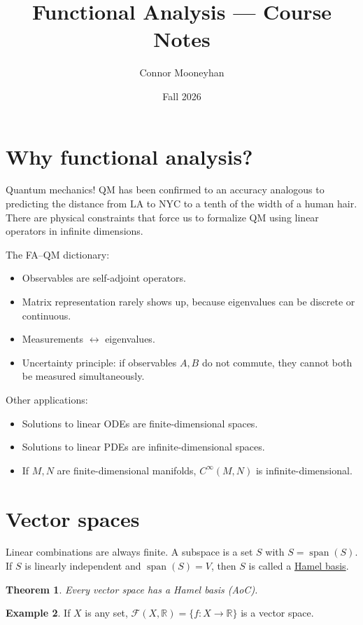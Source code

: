 \documentclass[12pt]{article}
\title{Functional Analysis --- Course Notes}
\author{Connor Mooneyhan}
\date{Fall 2026}
\DeclareMathOperator{\spn}{span}
\newcommand{\R}{\mathbb{R}}
\newtheorem{thm}{Theorem}[section]
\theoremstyle{definition}
\newtheorem{ex}[thm]{Example}
\begin{document}
\maketitle

\section{Why functional analysis?}

Quantum mechanics!
QM has been confirmed to an accuracy analogous to predicting the distance from LA to NYC to a tenth of the width of a human hair.
There are physical constraints that force us to formalize QM using linear operators in infinite dimensions.

The FA--QM dictionary:
\begin{itemize}[nosep]
	\item Observables are self-adjoint operators.
	\item Matrix representation rarely shows up, because eigenvalues can be discrete or continuous.
	\item Measurements $\leftrightarrow$ eigenvalues.
	\item Uncertainty principle: if observables $A, B$ do not commute, they cannot both be measured simultaneously.
\end{itemize}

Other applications:
\begin{itemize}[nosep]
	\item Solutions to linear ODEs are finite-dimensional spaces.
	\item Solutions to linear PDEs are infinite-dimensional spaces.
	\item If $M, N$ are finite-dimensional manifolds, $C^\infty(M,N)$ is infinite-dimensional.
\end{itemize}

\section{Vector spaces}

Linear combinations are always finite.
A subspace is a set $S$ with $S = \spn(S)$.
If $S$ is linearly independent and $\spn(S) = V$, then $S$ is called a \underline{Hamel basis}.

\begin{thm}
	Every vector space has a Hamel basis (AoC).
\end{thm}

\begin{ex}
	If $X$ is any set, $\mathscr{F}(X,\R) = \lbrace f : X \to \R \rbrace$ is a vector space.
\end{ex}
\end{document}
